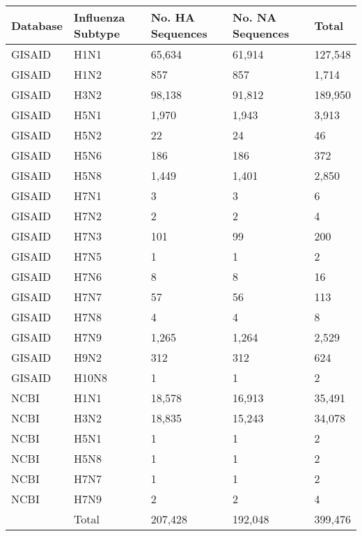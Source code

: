 \begin{tabular}{L{0.5in}|L{0.5in}|L{0.7in}|L{0.7in}|L{0.5in}}\hline
 Database & Influenza  Subtype & No.  HA  Sequences & No.  NA  Sequences & Total \\\hline
GISAID&H1N1&65,634&61,914&127,548\\\hline
GISAID&H1N2&857&857&1,714\\\hline
GISAID&H3N2&98,138&91,812&189,950\\\hline
GISAID&H5N1&1,970&1,943&3,913\\\hline
GISAID&H5N2&22&24&46\\\hline
GISAID&H5N6&186&186&372\\\hline
GISAID&H5N8&1,449&1,401&2,850\\\hline
GISAID&H7N1&3&3&6\\\hline
GISAID&H7N2&2&2&4\\\hline
GISAID&H7N3&101&99&200\\\hline
GISAID&H7N5&1&1&2\\\hline
GISAID&H7N6&8&8&16\\\hline
GISAID&H7N7&57&56&113\\\hline
GISAID&H7N8&4&4&8\\\hline
GISAID&H7N9&1,265&1,264&2,529\\\hline
GISAID&H9N2&312&312&624\\\hline
GISAID&H10N8&1&1&2\\\hline
NCBI&H1N1&18,578&16,913&35,491\\\hline
NCBI&H3N2&18,835&15,243&34,078\\\hline
NCBI&H5N1&1&1&2\\\hline
NCBI&H5N8&1&1&2\\\hline
NCBI&H7N7&1&1&2\\\hline
NCBI&H7N9&2&2&4\\\hline
&Total&207,428&192,048&399,476\\\hline
\end{tabular}
